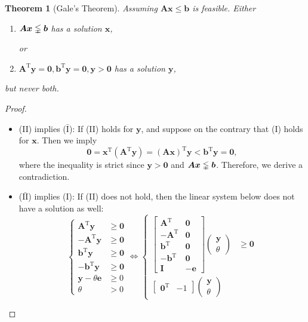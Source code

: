 \documentclass[12pt]{article}
\newcommand{\trans}{^{\mathrm T}}
\newtheorem{theorem}{Theorem}[section]
\begin{document}
\begin{theorem}[Gale's Theorem]
Assuming $\bm A\bm x\le\bm b$ is feasible.
Either
\begin{enumerate}
\item[(I)]
$\bm A\bm x\lvertneqq\bm b$ has a solution $\bm x$,

or
\item[(II)]
$\bm A\trans\bm y=\bm0,\bm b\trans\bm y=\bm0,\bm y>\bm0$ has a solution $\bm y$,
\end{enumerate}
but never both.
\end{theorem}
\begin{proof}
\begin{itemize}
\item
(II) implies ($\bar{\text{I}}$):
If (II) holds for $\bm y$, and suppose on the contrary that (I) holds for $\bm x$. Then we imply
\[
\bm0=\bm x\trans(\bm A\trans\bm y)=(\bm A\bm x)\trans\bm y< \bm b\trans\bm y=\bm0,
\]
where the inequality is strict since $\bm y>\bm0$ and $\bm A\bm x\lvertneqq\bm b$. Therefore, we derive a contradiction.
\item
($\bar{\text{II}}$) implies (I):
If (II) does not hold, then the linear system below does not have a solution as well:
\[
\left\{
\begin{aligned}
\bm A\trans\bm y&\ge\bm0\\
-\bm A\trans\bm y&\ge\bm0\\
\bm b\trans\bm y&\ge\bm0\\
-\bm b\trans\bm y&\ge\bm0\\
\bm y-\theta\bm e&\ge0\\
\theta&>0
\end{aligned}
\right.
\Longleftrightarrow
\left\{
\begin{aligned}
\begin{bmatrix}
\bm A\trans&\bm0\\
-\bm A\trans&\bm 0\\
\bm b\trans&\bm0\\
-\bm b\trans&\bm 0\\
\bm I&-\bm e
\end{bmatrix}\begin{pmatrix}
\bm y\\\theta
\end{pmatrix}&\ge\bm0\\
\begin{bmatrix}
\bm 0\trans&-1
\end{bmatrix}\begin{pmatrix}
\bm y\\\theta

\end{pmatrix}
\end{aligned}\]
\end{itemize}
\end{proof}
\end{document}
